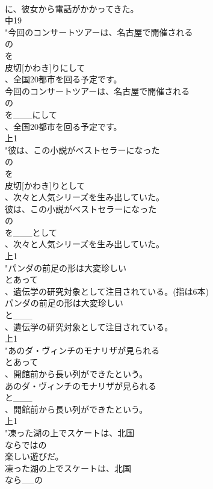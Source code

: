 \documentclass[8pt]{extreport}
\begin{document}
\begin{CJK}{UTF8}{min}
\\	に、彼女から電話がかかってきた。
\\	中19
\\	"今回のコンサートツアーは、名古屋で開催される
\\	の
\\	を
\\	皮切[かわき]りにして
\\	、全国20都市を回る予定です。
\\	今回のコンサートツアーは、名古屋で開催される
\\	の
\\	を___にして
\\	、全国20都市を回る予定です。
\\	上1
\\	"彼は、この小説がベストセラーになった
\\	の
\\	を
\\	皮切[かわき]りとして
\\	、次々と人気シリーズを生み出していた。
\\	彼は、この小説がベストセラーになった
\\	の
\\	を___として
\\	、次々と人気シリーズを生み出していた。
\\	上1
\\	"パンダの前足の形は大変珍しい
\\	とあって
\\	、遺伝学の研究対象として注目されている。(指は6本)
\\	パンダの前足の形は大変珍しい
\\	と___
\\	、遺伝学の研究対象として注目されている。
\\	上1
\\	"あのダ・ヴィンチのモナリザが見られる
\\	とあって
\\	、開館前から長い列ができたという。
\\	あのダ・ヴィンチのモナリザが見られる
\\	と___
\\	、開館前から長い列ができたという。
\\	上1
\\	"凍った湖の上でスケートは、北国
\\	ならではの
\\	楽しい遊びだ。
\\	凍った湖の上でスケートは、北国
\\	なら__の

\end{CJK}
\end{document}
